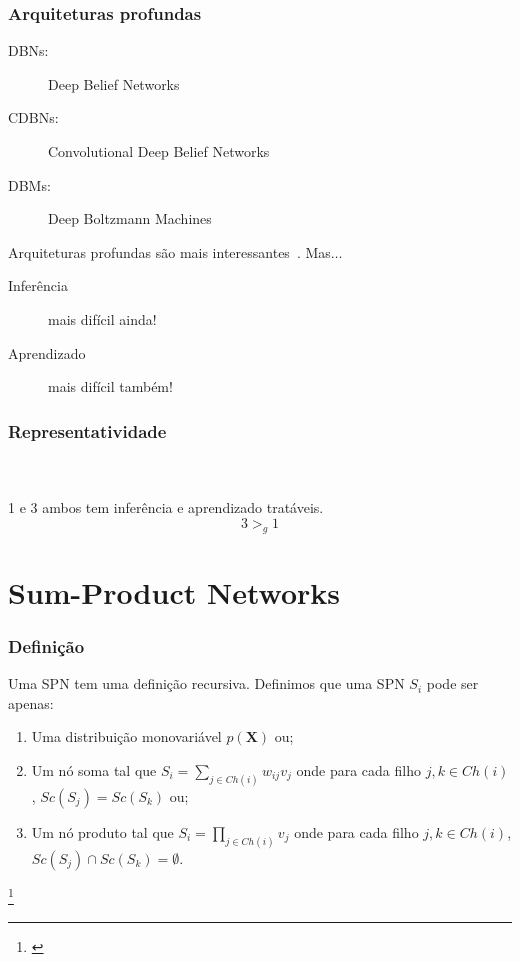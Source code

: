 \documentclass[10pt]{beamer}
\newcommand\nmfootnote[1]{%
  \begingroup
  \renewcommand\thefootnote{}\footnote{#1}%
  \addtocounter{footnote}{-1}%
  \endgroup
}
\theoremstyle{plain}
\newcommand{\set}[1]{\mathbf{#1}}
\begin{document}
\begin{frame}
  \frametitle{Arquiteturas profundas}
  \begin{description}
    \item[DBNs:] Deep Belief Networks~\cite{dbns}
    \item[CDBNs:] Convolutional Deep Belief Networks~\cite{cdbns}
    \item[DBMs:] Deep Boltzmann Machines~\cite{dbms}
  \end{description}
  Arquiteturas profundas são mais interessantes~\cite{deep-archs-ai}. Mas$\ldots$
  \begin{description}
    \item[Inferência] mais difícil ainda!
    \item[Aprendizado] mais difícil também!
  \end{description}
\end{frame}

\begin{frame}
  \frametitle{Representatividade}
  \\~\\

  1 e 3 ambos tem inferência e aprendizado tratáveis.
  \begin{equation*}
    3 >_g 1
  \end{equation*}
\end{frame}


\section[SPNs]{Sum-Product Networks}

\begin{frame}
  \frametitle{Definição}
  \begin{definition}\label{gd-def}
    Uma SPN tem uma definição recursiva. Definimos que uma SPN $S_i$ pode ser apenas:
    \begin{enumerate}[label=(\roman*)]
      \item\label{gd-ref-1} Uma distribuição monovariável $p(\set{X})$ ou;
      \item\label{gd-ref-2} Um nó soma tal que $S_i=\sum_{j\in Ch(i)} w_{ij}v_j$ onde para cada filho
        $j,k\in Ch(i)$, $Sc(S_j)=Sc(S_k)$ ou;
      \item\label{gd-ref-3} Um nó produto tal que $S_i=\prod_{j\in Ch(i)} v_j$ onde para cada filho
        $j,k\in Ch(i)$, $Sc(S_j)\cap Sc(S_k)=\emptyset$.
    \end{enumerate}
  \end{definition}\nmfootnote{\cite{gens-domingos}}
\end{frame}
\end{document}
